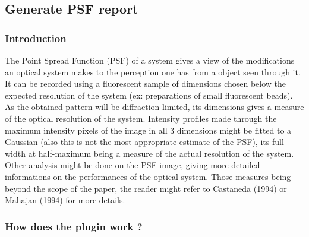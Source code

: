 \documentclass[]{spie}
\begin{document}
\subsection{Generate PSF report}
\label{subsec:gpr}

\subsubsection*{Introduction}
\label{subsubsec:gpr-intro}

The Point Spread Function (PSF) of a system gives a view of the modifications an optical system makes to the perception one has from a object seen through it. It can be recorded using a fluorescent sample of dimensions chosen below the expected resolution of the system (ex: preparations of small fluorescent beads). As the obtained pattern will be diffraction limited, its dimensions gives a measure of the optical resolution of the system. Intensity profiles made through the maximum intensity pixels of the image in all 3 dimensions might be fitted to a Gaussian (also this is not the most appropriate estimate of the PSF), its full width at half-maximum being a measure of the actual resolution of the system. Other analysis might be done on the PSF image, giving more detailed informations on the performances of the optical system. Those measures being beyond the scope of the paper, the reader might refer to Castaneda (1994)\cite{Castaneda1994} or Mahajan (1994)\cite{Mahajan1994} for more details.

\subsubsection*{How does the plugin work ?}
\label{subsubsec:gpr-pgWork}
\end{document}
